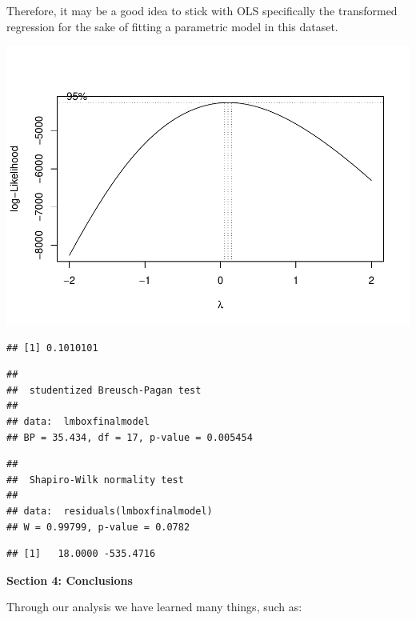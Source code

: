 \documentclass[
]{article}
\begin{document}
Therefore, it may be a good idea to stick with OLS specifically the
transformed regression for the sake of fitting a parametric model in
this dataset.

\includegraphics{Final_Project_2_files/figure-latex/unnamed-chunk-16-1.pdf}

\begin{verbatim}
## [1] 0.1010101
\end{verbatim}

\begin{verbatim}
## 
##  studentized Breusch-Pagan test
## 
## data:  lmboxfinalmodel
## BP = 35.434, df = 17, p-value = 0.005454
\end{verbatim}

\begin{verbatim}
## 
##  Shapiro-Wilk normality test
## 
## data:  residuals(lmboxfinalmodel)
## W = 0.99799, p-value = 0.0782
\end{verbatim}

\begin{verbatim}
## [1]   18.0000 -535.4716
\end{verbatim}

\textbf{Section 4: Conclusions}

Through our analysis we have learned many things, such as:
\end{document}
